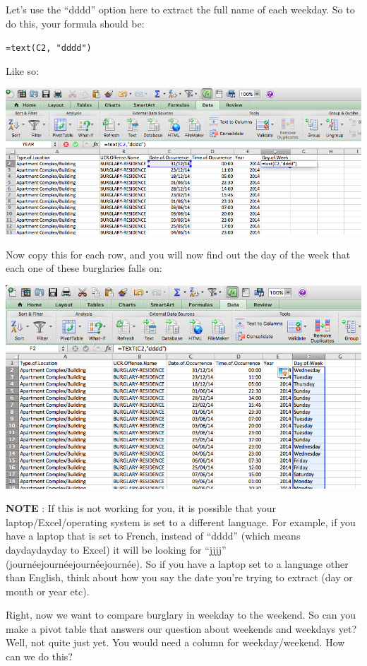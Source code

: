 \documentclass[
]{book}
\begin{document}
Let's use the ``dddd'' option here to extract the full name of each weekday. So to do this, your formula should be:

\texttt{=text(C2,\ "dddd")}

Like so:

\includegraphics{imgs/c2_dddd.png}

Now copy this for each row, and you will now find out the day of the week that each one of these burglaries falls on:

\includegraphics{imgs/dow_col.png}

\textbf{NOTE} : If this is not working for you, it is possible that your laptop/Excel/operating system is set to a different language. For example, if you have a laptop that is set to French, instead of ``dddd'' (which means daydaydayday to Excel) it will be looking for ``jjjj'' (journéejournéejournéejournée). So if you have a laptop set to a language other than English, think about how you say the date you're trying to extract (day or month or year etc).

Right, now we want to compare burglary in weekday to the weekend. So can you make a pivot table that answers our question about weekends and weekdays yet? Well, not quite just yet. You would need a column for weekday/weekend. How can we do this?
\end{document}
